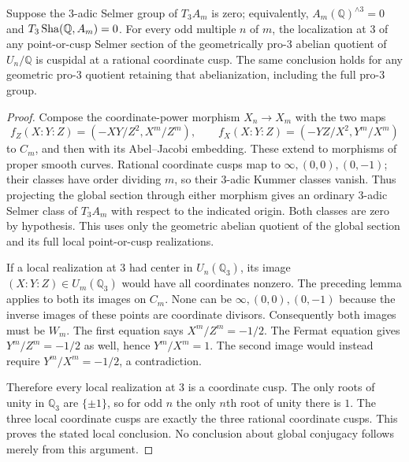 \begin{proposition}\label{prop:localtwomaps}
Suppose the $3$-adic Selmer group of $T_3A_m$ is zero; equivalently,
$A_m(\mathbb Q)^{\wedge3}=0$ and $T_3\operatorname{Sha}(\mathbb Q,A_m)=0$.
For every odd multiple $n$ of $m$, the localization at $3$ of any
point-or-cusp Selmer section of the geometrically pro-$3$ abelian
quotient of $U_n/\mathbb Q$ is cuspidal at a rational coordinate
cusp. The same conclusion holds for any geometric pro-$3$ quotient
retaining that abelianization, including the full pro-$3$ group.
\end{proposition}
\begin{proof}
Compose the coordinate-power morphism $X_n\to X_m$ with the two maps
\[
 f_Z(X:Y:Z)=\left(-XY/Z^2,X^m/Z^m\right),\qquad
 f_X(X:Y:Z)=\left(-YZ/X^2,Y^m/X^m\right)
\]
to $C_m$, and then with its Abel--Jacobi embedding. These extend to
morphisms of proper smooth curves. Rational coordinate cusps map to
$\infty,(0,0),(0,-1)$; their classes have order dividing $m$, so their
$3$-adic Kummer classes vanish. Thus projecting the global section
through either morphism gives an ordinary $3$-adic Selmer class of
$T_3A_m$ with respect to the indicated origin. Both classes are zero
by hypothesis. This uses only the geometric abelian quotient of the
global section and its full local point-or-cusp realizations.

If a local realization at $3$ had center in $U_n(\mathbb Q_3)$, its
image $(X:Y:Z)\in U_m(\mathbb Q_3)$ would have all coordinates nonzero.
The preceding lemma applies to both its images on $C_m$. None can be
$\infty,(0,0),(0,-1)$ because the inverse images of these points are
coordinate divisors. Consequently both images must be $W_m$.
The first equation says $X^m/Z^m=-1/2$. The Fermat equation gives
$Y^m/Z^m=-1/2$ as well, hence $Y^m/X^m=1$. The second image would
instead require $Y^m/X^m=-1/2$, a contradiction.

Therefore every local realization at $3$ is a coordinate cusp.
The only roots of unity in $\mathbb Q_3$ are $\{\pm1\}$, so for odd
$n$ the only $n$th root of unity there is $1$. The three local
coordinate cusps are exactly the three rational coordinate cusps.
This proves the stated local conclusion. No conclusion about global
conjugacy follows merely from this argument.
\end{proof}

